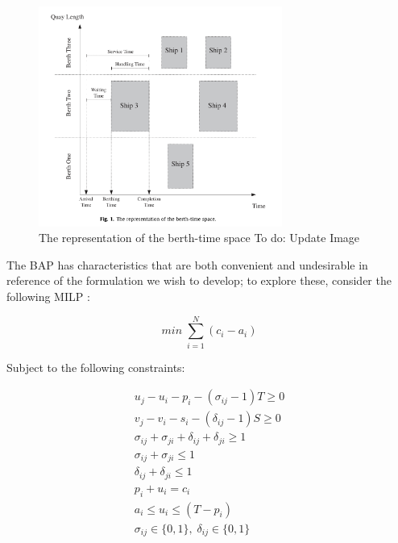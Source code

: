 \documentclass[letterpaper, 10pt, conference]{IEEEtran}
\newcommand{\TODO}[1]{{\color{green} To do: #1}} %
\begin{document}
\begin{figure}
	\centerline{\includegraphics[width=8cm]{bap.png}}
	\caption{The representation of the berth-time space \TODO{Update Image}}
	\label{fig:bap}
\end{figure}

The BAP has characteristics that are both convenient and undesirable in reference of the formulation we wish to develop; to explore these, consider the following MILP \cite{Qarebagh2019}:

\begin{equation}
	\label{eq:bapobjective}
	min\; \sum_{i=1}^N (c_i - a_i)
\end{equation}

Subject to the following constraints:

\begin{subequations}
\label{eq:bapconstrs}
\begin{align}
    u_j - u_i - p_i - (\sigma_{ij} - 1)T \geq 0                     \label{subeq:baptime}         \\
    v_j - v_i - s_i - (\delta_{ij} - 1)S \geq 0                     \label{subeq:bapspace}        \\
    \sigma_{ij} + \sigma_{ji} + \delta_{ij} + \delta_{ji} \geq 1    \label{subeq:bapvalid_pos}    \\
    \sigma_{ij} + \sigma_{ji} \leq 1                                \label{subeq:bapsigma}        \\
    \delta_{ij} + \delta_{ji} \leq 1                                \label{subeq:bapdelta}        \\
    p_i + u_i = c_i                                                 \label{subeq:bapdetach}       \\
    a_i \leq u_i \leq (T - p_i)                                     \label{subeq:bapvalid_starts} \\
    \sigma_{ij} \in \{0,1\},\;\delta_{ij} \in \{0,1\}               \label{subeq:sdspace}
\end{align}
\end{subequations}
\end{document}
